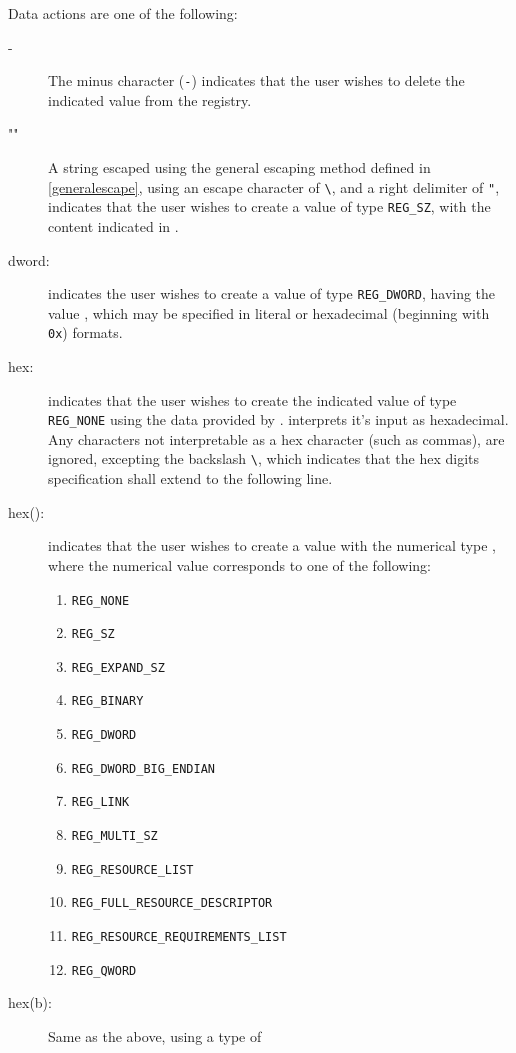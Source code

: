 Data actions are one of the following:
\begin{description}
\item[-] The minus character (\verb|-|) indicates that the user wishes to delete
the indicated value from the registry.
\item[""] A string escaped using the general escaping method defined
in \ref{generalescape}, using an escape character of \verb|\|, and a right
delimiter of \verb|"|, indicates that the user wishes to create a value of type
\verb|REG_SZ|, with the content indicated in .
\item[dword:] indicates the user wishes to create a value of type
\verb|REG_DWORD|, having the value , which may be specified in
literal or hexadecimal (beginning with \verb|0x|) formats.
\item[hex:] indicates that the user wishes to create the
indicated value of type \verb|REG_NONE| using the data provided by
.  interprets it's input as hexadecimal. Any
characters not interpretable as a hex character (such as commas), are ignored,
excepting the backslash \verb|\|, which indicates that the hex digits
specification shall extend to the following line.
\item[hex():] indicates that the user wishes to create
a value with the numerical type , where the numerical value
corresponds to one of the following:
\begin{enumerate}
\setcounter{enumi}{0}
    \item \verb|REG_NONE|
    \item \verb|REG_SZ|
    \item \verb|REG_EXPAND_SZ|
    \item \verb|REG_BINARY|
    \item \verb|REG_DWORD|
    \item \verb|REG_DWORD_BIG_ENDIAN|
    \item \verb|REG_LINK|
    \item \verb|REG_MULTI_SZ|
    \item \verb|REG_RESOURCE_LIST|
    \item \verb|REG_FULL_RESOURCE_DESCRIPTOR|
    \item \verb|REG_RESOURCE_REQUIREMENTS_LIST|
    \item \verb|REG_QWORD|
\end{enumerate}
\item[hex(b):] Same as the above, using a type of

\end{description}
